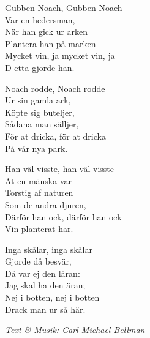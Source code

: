 \vspace{10pt}
\revrpt Gubben Noach, Gubben Noach\\ 
Var en hedersman,\rpt \\ 
När han gick ur arken\\ 
Plantera han på marken\\ 
Mycket vin, ja mycket vin, ja\\ 
D etta gjorde han.\par
\vspace{10pt}
\revrpt Noach rodde, Noach rodde\\ 
Ur sin gamla ark,\rpt \\ 
Köpte sig buteljer,\\ 
Sådana man sälljer,\\ 
För at dricka, för at dricka\\ 
På vår nya park.\par
\vspace{10pt}
\revrpt Han väl visste, han väl visste\\ 
At en mänska var\rpt \\ 
Torstig af naturen\\ 
Som de andra djuren,\\ 
Därför han ock, därför han ock\\ 
Vin planterat har.\par
\vspace{10pt}
\revrpt Inga skålar, inga skålar\\ 
Gjorde då besvär,\rpt \\ 
Då var ej den läran:\\ 
Jag skal ha den äran;\\ 
Nej i botten, nej i botten\\ 
Drack man ur så här.\par
\vspace{10pt}
{\footnotesize\textit{Text \& Musik: Carl Michael Bellman}} 
